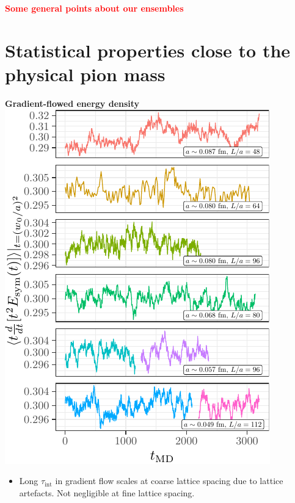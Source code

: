 \documentclass[a0,portrait]{a0poster}
\begin{document}
\begin{multicols}{2}
    \textcolor{red}{\textbf{Some general points about our ensembles}}

    \section{Statistical properties close to the physical pion mass}
    \begin{minipage}{0.48\linewidth}
        \centering
        \textbf{\hspace{3cm}Gradient-flowed energy density}\\
        \includegraphics[width=\linewidth,page=1]{data/gf_observables/gf_observables_md_histories}
        \begin{itemize}
            \item Long $\tau_\mathrm{int}$ in gradient flow scales at coarse lattice spacing due to lattice artefacts. Not negligible at fine lattice spacing.
        \end{itemize}
    \end{minipage}

\end{multicols}
\end{document}
